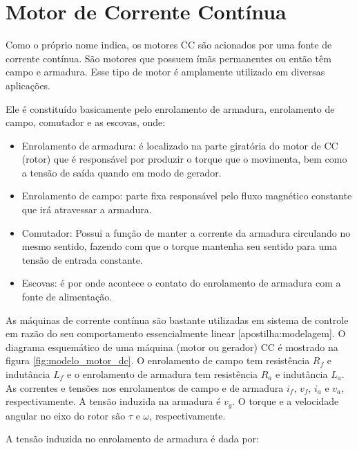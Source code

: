 \section{Motor de Corrente Contínua}
Como o próprio nome indica, os motores CC são acionados por uma fonte de corrente contínua. São motores que possuem ímãs permanentes ou então têm campo e armadura. Esse tipo de motor é amplamente utilizado em diversas aplicações.

Ele é constituído basicamente pelo enrolamento de armadura, enrolamento de campo, comutador e as escovas, onde:

\begin{itemize}
    \item Enrolamento de armadura: é localizado na parte giratória do motor de CC (rotor) que é responsável por produzir o torque que o movimenta, bem como a tensão de saída quando em modo de gerador.
    
    \item Enrolamento de campo: parte fixa responsável pelo fluxo magnético constante que irá atravessar a armadura. 
    
    \item Comutador: Possui a função de manter a corrente da armadura circulando no mesmo sentido, fazendo com que o torque mantenha seu sentido para uma tensão de entrada constante.
    
    \item Escovas: é por onde acontece o contato do enrolamento de armadura com a fonte de alimentação.
\end{itemize}


As máquinas de corrente contínua são bastante utilizadas em sistema de controle em razão do seu comportamento essencialmente linear [apostilha:modelagem]. O diagrama esquemático de uma máquina (motor ou gerador) CC é mostrado na figura \ref{fig:modelo_motor_dc}. O enrolamento de campo tem resistência $R_f$ e indutância $L_f$ e o enrolamento de armadura tem resistência $R_a$ e indutância $L_a$. As correntes e tensões nos enrolamentos de campo e de armadura $i_f$, $v_f$, $i_a$ e $v_a$, respectivamente. A tensão induzida na armadura é $v_g$. O torque e a velocidade angular no eixo do rotor são $\tau$ e $\omega$, respectivamente.

A tensão induzida no enrolamento de armadura é dada por:

